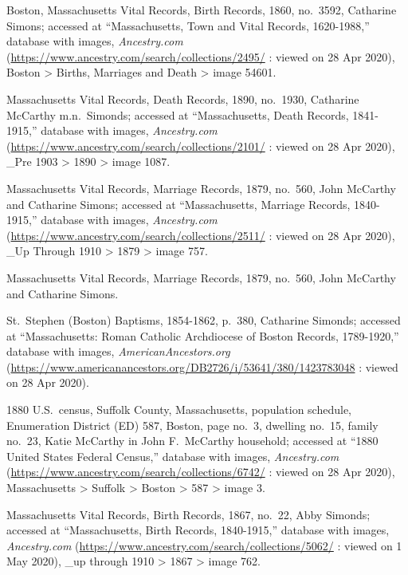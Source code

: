 \begin{thebibliography}{999}
	


Boston, Massachusetts Vital Records, Birth Records, 1860, no.\ 3592, Catharine Simons; accessed at ``Massachusetts, Town and Vital Records, 1620-1988,'' database with images, \textit{Ancestry.com} (\url{https://www.ancestry.com/search/collections/2495/} : viewed on 28 Apr 2020), Boston > Births, Marriages and Death > image 54601.

Massachusetts Vital Records, Death Records, 1890, no.\ 1930, Catharine McCarthy m.n.\ Simonds; accessed at ``Massachusetts, Death Records, 1841-1915,'' database with images, \textit{Ancestry.com} (\url{https://www.ancestry.com/search/collections/2101/} : viewed on 28 Apr 2020), \_Pre 1903 > 1890 > image 1087.

Massachusetts Vital Records, Marriage Records, 1879, no.\ 560, John McCarthy and Catharine Simons; accessed at ``Massachusetts, Marriage Records, 1840-1915,'' database with images, \textit{Ancestry.com} (\url{https://www.ancestry.com/search/collections/2511/} : viewed on 28 Apr 2020), \_Up Through 1910 > 1879 > image 757.

Massachusetts Vital Records, Marriage Records, 1879, no.\ 560, John McCarthy and Catharine Simons.

St.\ Stephen (Boston) Baptisms, 1854-1862, p.\ 380, Catharine Simonds; accessed at ``Massachusetts: Roman Catholic Archdiocese of Boston Records, 1789-1920,'' database with images, \textit{AmericanAncestors.org} (\url{https://www.americanancestors.org/DB2726/i/53641/380/1423783048} : viewed on 28 Apr 2020).

1880 U.S.\ census, Suffolk County, Massachusetts, population schedule, Enumeration District (ED) 587, Boston, page no.\ 3, dwelling no.\ 15, family no.\ 23, Katie McCarthy in John F.\ McCarthy household; accessed at ``1880 United States Federal Census,'' database with images, \textit{Ancestry.com} (\url{https://www.ancestry.com/search/collections/6742/} : viewed on 28 Apr 2020), Massachusetts > Suffolk > Boston > 587 > image 3.


Massachusetts Vital Records, Birth Records, 1867, no.\ 22, Abby Simonds; accessed at ``Massachusetts, Birth Records, 1840-1915,'' database with images, \textit{Ancestry.com} (\url{https://www.ancestry.com/search/collections/5062/} : viewed on 1 May 2020), \_up through 1910 > 1867 > image 762.


\end{thebibliography}
